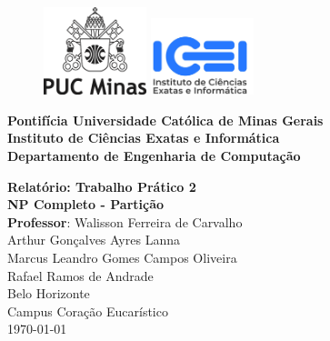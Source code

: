\thispagestyle{empty} %

\begin{figure}[t]
    \includegraphics[width=3cm]{images/logo-puc-minas.png}
    \hspace{0.02\textwidth}
    \vline%
    \hspace{0.04\textwidth}
    \includegraphics[width=3cm]{images/logo-icei.jpeg}
\end{figure}

\hrulefill%
\vspace{\baselineskip}

\Large\noindent
\textbf{Pontifícia Universidade Católica de Minas Gerais} \\
\textbf{Instituto de Ciências Exatas e Informática} \\
\textbf{Departamento de Engenharia de Computação}

\begin{center}
    \vfill
    \Huge\textbf{Relatório: Trabalho Prático 2} \\
    \vspace{0.5 cm}
    \Large\textbf{NP Completo - Partição} \\
    \vspace{1 cm}
    \large \textbf{Professor}: Walisson Ferreira de Carvalho \\
    \vspace{0.5 cm}
    \large Arthur Gonçalves Ayres Lanna  \\
    \large Marcus Leandro Gomes Campos Oliveira \\
    \large Rafael Ramos de Andrade \\
    \vfill
    \large Belo Horizonte \\ Campus Coração Eucarístico \\
    \vspace{\baselineskip}
    \large \today
\end{center}